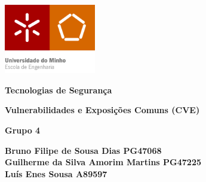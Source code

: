 \documentclass[11t]{article}
\begin{document}
\begin{titlepage}
   \begin{center}
        \includegraphics[width=0.3\textwidth]{images/EEUMfinal.png}

        \vspace{1cm}
        \textbf{\LARGE Tecnologias de Segurança}
    
        \vspace{0.5cm}
        \textbf{\Large Vulnerabilidades e Exposições Comuns (CVE)}

        \vspace{1cm}
        
        \textbf{\Large Grupo 4}
        
        \vspace{0.5cm}
        
        \textbf{\large 
        Bruno Filipe de Sousa Dias PG47068 \\
        Guilherme da Silva Amorim Martins PG47225 \\
        Luís Enes Sousa A89597 \\
        }

        \vspace{0.5cm}
    

\end{center}
\end{titlepage}
\end{document}
